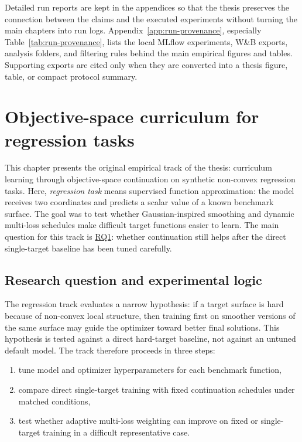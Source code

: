 \documentclass[english,master,a4paper,oneside]{ppfcmthesis}
\begin{document}
Detailed run reports are kept in the appendices so that the thesis preserves the
connection between the claims and the executed experiments without turning the
main chapters into run logs. Appendix~\ref{app:run-provenance}, especially
Table~\ref{tab:run-provenance}, lists the local MLflow experiments, W\&B
exports, analysis folders, and filtering rules behind the main empirical
figures and tables. Supporting exports are cited only when they are converted
into a thesis figure, table, or compact protocol summary.


\chapter{Objective-space curriculum for regression tasks}
\label{chap:regression-curriculum}

This chapter presents the original empirical track of the thesis: curriculum
learning through objective-space continuation on synthetic non-convex regression
tasks. Here, \emph{regression task} means supervised function approximation: the
model receives two coordinates and predicts a scalar value of a known benchmark
surface. The goal was to test whether Gaussian-inspired smoothing and dynamic
multi-loss schedules make difficult target functions easier to learn. The main
question for this track is \hyperref[rq:continuation]{RQ1}: whether continuation
still helps after the direct single-target baseline has been tuned carefully.

\section{Research question and experimental logic}

The regression track evaluates a narrow hypothesis: if a target surface is hard
because of non-convex local structure, then training first on smoother versions
of the same surface may guide the optimizer toward better final solutions. This
hypothesis is tested against a direct hard-target baseline, not against an
untuned default model. The track therefore proceeds in three steps:

\begin{enumerate}
    \item tune model and optimizer hyperparameters for each benchmark function,
    \item compare direct single-target training with fixed continuation
          schedules under matched conditions,
    \item test whether adaptive multi-loss weighting can improve on fixed or
          single-target training in a difficult representative case.
\end{enumerate}
\end{document}
